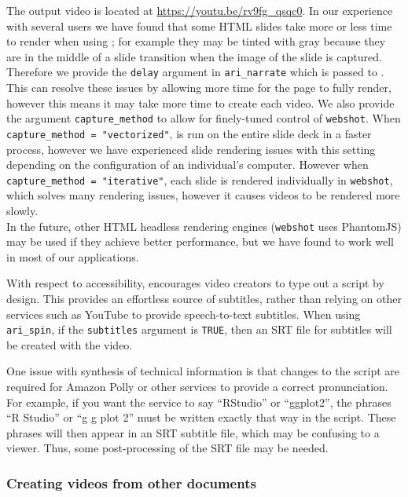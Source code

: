 The output video is located at \url{https://youtu.be/rv9fg_qsqc0}. In
our experience with several users we have found that some HTML slides
take more or less time to render when using ; for example
they may be tinted with gray because they are in the middle of a slide
transition when the image of the slide is captured. Therefore we provide
the \texttt{delay} argument in \texttt{ari\_narrate} which is passed to
. This can resolve these issues by allowing more time for
the page to fully render, however this means it may take more time to
create each video. We also provide the argument \texttt{capture\_method}
to allow for finely-tuned control of \texttt{webshot}. When
\texttt{capture\_method\ =\ "vectorized"},  is run on the
entire slide deck in a faster process, however we have experienced slide
rendering issues with this setting depending on the configuration of an
individual's computer. However when
\texttt{capture\_method\ =\ "iterative"}, each slide is rendered
individually in \texttt{webshot}, which solves many rendering issues,
however it causes videos to be rendered more slowly.\\
In the future, other HTML headless rendering engines (\texttt{webshot}
uses PhantomJS) may be used if they achieve better performance, but we
have found  to work well in most of our applications.

With respect to accessibility,  encourages video creators to
type out a script by design. This provides an effortless source of
subtitles, rather than relying on other services such as YouTube to
provide speech-to-text subtitles. When using \texttt{ari\_spin}, if the
\texttt{subtitles} argument is \texttt{TRUE}, then an SRT file for
subtitles will be created with the video.

One issue with synthesis of technical information is that changes to the
script are required for Amazon Polly or other services to provide a
correct pronunciation. For example, if you want the service to say
``RStudio'' or ``ggplot2'', the phrases ``R Studio'' or ``g g plot 2''
must be written exactly that way in the script. These phrases will then
appear in an SRT subtitle file, which may be confusing to a viewer.
Thus, some post-processing of the SRT file may be needed.

\hypertarget{creating-videos-from-other-documents}{%
\subsubsection{Creating videos from other
documents}\label{creating-videos-from-other-documents}}

